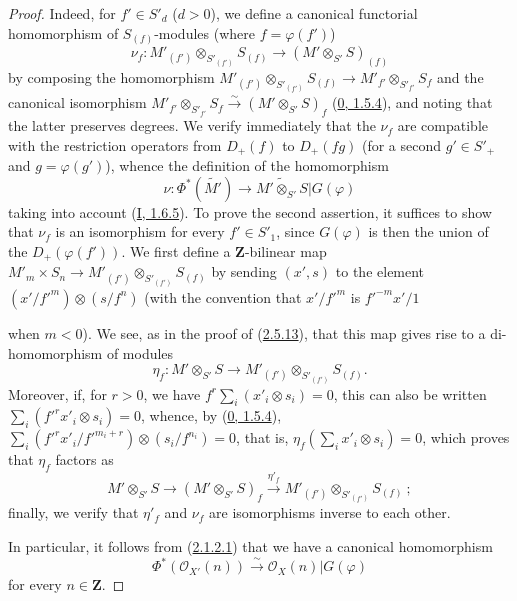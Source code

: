 \begin{proof}
Indeed, for $f'\in S'_d$ ($d>0$), we define a canonical functorial
homomorphism of $S_{(f)}$-modules (where $f=\varphi(f')$)
\[
\label{II.2.8.8.1}
  \nu_f:M'_{(f')}\otimes_{S'_{(f')}}S_{(f)}
  \longrightarrow(M'\otimes_{S'}S)_{(f)}
\tag{2.8.8.1}
\]
by composing the homomorphism
$M'_{(f')}\otimes_{S'_{(f')}}S_{(f)}\to
M'_{f'}\otimes_{S'_{f'}}S_f$ and the canonical isomorphism
$M'_{f'}\otimes_{S'_{f'}}S_f\xrightarrow{\sim}(M'\otimes_{S'}S)_f$
(\hyperref[0.1.5.4]{0, 1.5.4}), and noting that the latter preserves
degrees. We verify immediately that the $\nu_f$ are compatible with the
restriction operators from $D_+(f)$ to $D_+(fg)$ (for a second $g'\in S'_+$
and $g=\varphi(g')$), whence the definition of the homomorphism
\[
  \nu:\Phi^*(\widetilde{M'})
  \longrightarrow\widetilde{M'\otimes_{S'}S}|G(\varphi)
\]
taking into account (\hyperref[I.1.6.5]{I, 1.6.5}). To prove the second
assertion, it suffices to show that $\nu_f$ is an isomorphism for every
$f'\in S'_1$, since $G(\varphi)$ is then the union of the
$D_+(\varphi(f'))$. We first define a $\mathbf{Z}$-bilinear map
$M'_m\times S_n\to M'_{(f')}\otimes_{S'_{(f')}}S_{(f)}$ by sending
$(x',s)$ to the element
$(x'/{f'}^m)\otimes(s/f^n)$ (with the convention that $x'/{f'}^m$ is
${f'}^{-m}x'/1$

when $m<0$). We see, as in the proof of
(\hyperref[II.2.5.13]{2.5.13}), that this map gives rise to a
di-homomorphism of modules
\[
  \eta_f:M'\otimes_{S'}S
  \longrightarrow M'_{(f')}\otimes_{S'_{(f')}}S_{(f)}.
\]
Moreover, if, for $r>0$, we have
$f^r\sum_i(x'_i\otimes s_i)=0$, this can also be written
$\sum_i({f'}^rx'_i\otimes s_i)=0$, whence, by
(\hyperref[0.1.5.4]{0, 1.5.4}),
$\sum_i({f'}^rx'_i/{f'}^{m_i+r})\otimes(s_i/f^{n_i})=0$, that is,
$\eta_f(\sum_i x'_i\otimes s_i)=0$, which proves that $\eta_f$ factors
as
\[
  M'\otimes_{S'}S\longrightarrow(M'\otimes_{S'}S)_f
  \xrightarrow{\eta'_f}M'_{(f')}\otimes_{S'_{(f')}}S_{(f)}~;
\]
finally, we verify that $\eta'_f$ and $\nu_f$ are isomorphisms inverse to each
other.

In particular, it follows from (\hyperref[II.2.1.2.1]{2.1.2.1}) that we
have a canonical homomorphism
\[
\label{II.2.8.8.2}
  \Phi^*(\mathcal{O}_{X'}(n))\xrightarrow{\sim}
  \mathcal{O}_X(n)|G(\varphi)
\tag{2.8.8.2}
\]
for every $n\in\mathbf{Z}$.
\end{proof}

